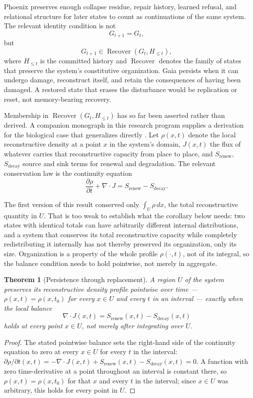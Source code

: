 \documentclass[11pt]{article}
\newcommand{\Recover}{\operatorname{Recover}}
\newtheorem{theorem}{Theorem}
\begin{document}
Phoenix preserves enough collapse residue, repair history, learned refusal, and relational structure for later states to count as continuations of the same system. The relevant identity condition is not
\[
G_{t+1} = G_t,
\]
but
\[
G_{t+1} \in \Recover(G_t, H_{\leq t}),
\]
where $H_{\leq t}$ is the committed history and $\Recover$ denotes the family of states that preserve the system's constitutive organization. Gaia persists when it can undergo damage, reconstruct itself, and retain the consequences of having been damaged. A restored state that erases the disturbance would be replication or reset, not memory-bearing recovery.

Membership in $\Recover(G_t,H_{\leq t})$ has so far been asserted rather than derived. A companion monograph in this research program supplies a derivation for the biological case that generalizes directly \cite{flyxionMem8Monograph}. Let $\rho(x,t)$ denote the local reconstructive density at a point $x$ in the system's domain, $J(x,t)$ the flux of whatever carries that reconstructive capacity from place to place, and $S_{\mathrm{renew}}$, $S_{\mathrm{decay}}$ source and sink terms for renewal and degradation. The relevant conservation law is the continuity equation
\[
\frac{\partial \rho}{\partial t} + \nabla\cdot J = S_{\mathrm{renew}} - S_{\mathrm{decay}}.
\]

The first version of this result conserved only $\int_U\rho\,dx$, the total reconstructive quantity in $U$. That is too weak to establish what the corollary below needs: two states with identical totals can have arbitrarily different internal distributions, and a system that conserves its total reconstructive capacity while completely redistributing it internally has not thereby preserved its organization, only its size. Organization is a property of the whole profile $\rho(\cdot,t)$, not of its integral, so the balance condition needs to hold pointwise, not merely in aggregate.

\begin{theorem}[Persistence through replacement]
\label{thm:persistence}
A region $U$ of the system preserves its reconstructive density profile pointwise over time --- $\rho(x,t)=\rho(x,t_0)$ for every $x\in U$ and every $t$ in an interval --- exactly when the local balance
\[
\nabla\cdot J(x,t) = S_{\mathrm{renew}}(x,t) - S_{\mathrm{decay}}(x,t)
\]
holds at every point $x\in U$, not merely after integrating over $U$.
\end{theorem}

\begin{proof}
The stated pointwise balance sets the right-hand side of the continuity equation to zero at every $x\in U$ for every $t$ in the interval: $\partial\rho/\partial t(x,t) = -\nabla\cdot J(x,t) + S_{\mathrm{renew}}(x,t)-S_{\mathrm{decay}}(x,t) = 0$. A function with zero time-derivative at a point throughout an interval is constant there, so $\rho(x,t)=\rho(x,t_0)$ for that $x$ and every $t$ in the interval; since $x\in U$ was arbitrary, this holds for every point in $U$.
\end{proof}
\end{document}
